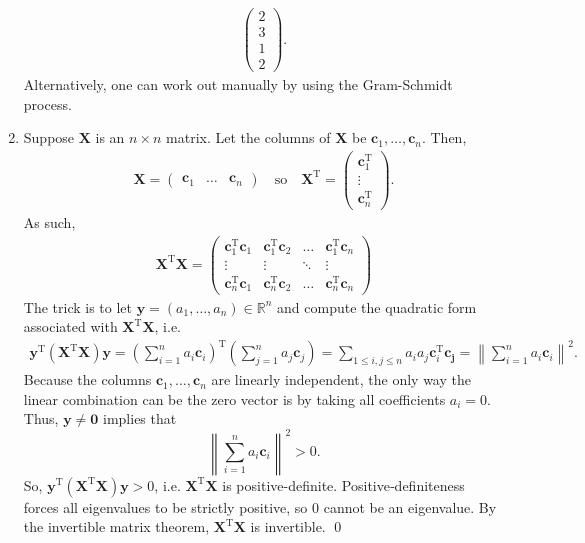 \documentclass[12pt]{article}
\begin{document}
\begin{enumerate}[label=\textbf{(\alph*)}]
\begin{align*}
\begin{pmatrix}
      2\\3\\1\\2
  \end{pmatrix}.
    \end{align*}
    Alternatively, one can work out manually by using the Gram-Schmidt process.
    \item Suppose $\mathbf{X}$ is an $n\times n$ matrix. Let the columns of $\mathbf{X}$ be $\mathbf{c}_1,\ldots,\mathbf{c}_n$. Then, \begin{align*}
        \mathbf{X}=\begin{pmatrix}
            \mathbf{c}_1 & \ldots & \mathbf{c}_n
        \end{pmatrix}\quad\text{so}\quad \mathbf{X}^\text{T}=\begin{pmatrix}
            \mathbf{c}_1^\text{T} \\ \vdots \\ \mathbf{c}_n^\text{T}
        \end{pmatrix}.
    \end{align*}
    As such, \begin{align*}
        \mathbf{X}^\text{T}\mathbf{X}=\begin{pmatrix}
            \mathbf{c}_1^\text{T}\mathbf{c}_1 & \mathbf{c}_1^\text{T}\mathbf{c}_2 & \ldots& \mathbf{c}_1^\text{T}\mathbf{c}_n \\ \vdots & \vdots & \ddots & \vdots \\ \mathbf{c}_n^\text{T}\mathbf{c}_1 &\mathbf{c}_n^\text{T}\mathbf{c}_2 & \ldots & \mathbf{c}_n^\text{T}\mathbf{c}_n
        \end{pmatrix}
    \end{align*}
    The trick is to let \(\mathbf{y}=\left(a_1,\ldots,a_n\right)\in\mathbb R^{n}\) and compute the quadratic form associated with \(\mathbf{X}^\text{T}\mathbf{X}\), i.e. \begin{align*}
        \mathbf{y}^\text{T}\left(\mathbf{X}^\text{T}\mathbf{X}\right)\mathbf{y}=\left(\sum_{i=1}^{n}a_i\mathbf{c}_i\right)^\text{T}\left(\sum_{j=1}^{n}a_j\mathbf{c}_j\right)=\sum_{1\le i,j\le n}a_ia_j\mathbf{c}_i^\text{T}\mathbf{c_j}=\left\|\sum_{i=1}^{n}a_i\mathbf{c}_i\right\|^2.
    \end{align*}
Because the columns \(\mathbf{c}_1,\ldots,\mathbf{c}_n\) are linearly independent, the only way the linear combination can be the zero vector is by taking all coefficients \(a_i=0\). Thus, $\mathbf{y}\ne \mathbf{0}$ implies that \[\left\|\sum_{i=1}^{n}a_i\mathbf{c}_i\right\|^2>0.\]
So, $\mathbf{y}^\text{T}\left(\mathbf{X}^\text{T}\mathbf{X}\right)\mathbf{y}>0$, i.e. $\mathbf{X}^\text{T}\mathbf{X}$ is positive-definite. Positive‑definiteness forces all eigenvalues to be strictly positive, so \(0\) cannot be an eigenvalue. By the invertible matrix theorem, $\mathbf{X}^\text{T}\mathbf{X}$ is invertible. \qed 
\end{enumerate}
\end{document}
